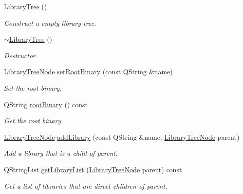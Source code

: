 \begin{DoxyCompactItemize}
\item 
\hyperlink{class_mdt_1_1_deploy_utils_1_1_library_tree_a5e2c5933e88786b6e67709c2887e15de}{Library\+Tree} ()
\begin{DoxyCompactList}\small\item\em Construct a empty library tree. \end{DoxyCompactList}\item 
\hyperlink{class_mdt_1_1_deploy_utils_1_1_library_tree_a6682b1ebd66c94223cd3b43f5c4878f3}{$\sim$\+Library\+Tree} ()
\begin{DoxyCompactList}\small\item\em Destructor. \end{DoxyCompactList}\item 
\hyperlink{class_mdt_1_1_deploy_utils_1_1_library_tree_node}{Library\+Tree\+Node} \hyperlink{class_mdt_1_1_deploy_utils_1_1_library_tree_ab11aef58e0492638f23169073820ffac}{set\+Root\+Binary} (const Q\+String \&name)
\begin{DoxyCompactList}\small\item\em Set the root binary. \end{DoxyCompactList}\item 
Q\+String \hyperlink{class_mdt_1_1_deploy_utils_1_1_library_tree_ac58cd1beebbbb7c8b1606670e38d2a69}{root\+Binary} () const 
\begin{DoxyCompactList}\small\item\em Get the root binary. \end{DoxyCompactList}\item 
\hyperlink{class_mdt_1_1_deploy_utils_1_1_library_tree_node}{Library\+Tree\+Node} \hyperlink{class_mdt_1_1_deploy_utils_1_1_library_tree_aed0a4f339a65e462a578e00231cf522c}{add\+Library} (const Q\+String \&name, \hyperlink{class_mdt_1_1_deploy_utils_1_1_library_tree_node}{Library\+Tree\+Node} parent)
\begin{DoxyCompactList}\small\item\em Add a library that is a child of {\itshape parent}. \end{DoxyCompactList}\item 
Q\+String\+List \hyperlink{class_mdt_1_1_deploy_utils_1_1_library_tree_a150df5c2a8a9a05c38e3172b9a4a4f21}{get\+Library\+List} (\hyperlink{class_mdt_1_1_deploy_utils_1_1_library_tree_node}{Library\+Tree\+Node} parent) const 
\begin{DoxyCompactList}\small\item\em Get a list of libraries that are direct children of {\itshape parent}. \end{DoxyCompactList}\item 

\end{DoxyCompactItemize}
